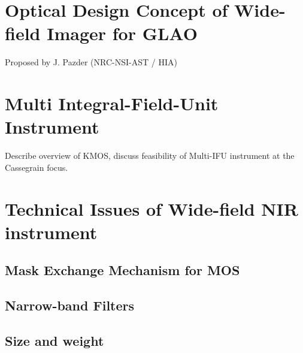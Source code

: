 
\section{Optical Design Concept of Wide-field Imager for GLAO}

Proposed by J. Pazder (NRC-NSI-AST / HIA)

\bigskip

\section{Multi Integral-Field-Unit Instrument}

Describe overview of KMOS, discuss feasibility of Multi-IFU instrument
at the Cassegrain focus.

\bigskip

\section{Technical Issues of Wide-field NIR instrument}

\subsection{Mask Exchange Mechanism for MOS}

\subsection{Narrow-band Filters}

\subsection{Size and weight}
